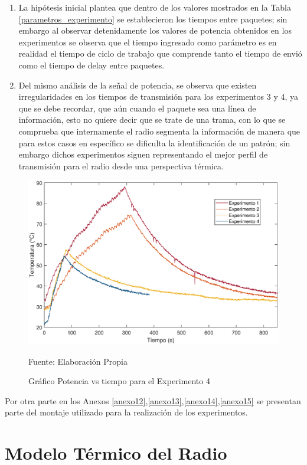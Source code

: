 \begin{enumerate}
     \item La hipótesis inicial plantea que dentro de los valores mostrados en la Tabla \ref{parametros_experimento} se establecieron los tiempos entre paquetes; sin embargo al observar detenidamente los valores de potencia obtenidos en los experimentos se observa que el tiempo ingresado como parámetro es en realidad el tiempo de ciclo de trabajo que comprende tanto el tiempo de envió como el tiempo de delay entre paquetes.
    \item Del mismo análisis de la señal de potencia, se observa que existen irregularidades en los tiempos de transmisión para los experimentos 3 y 4, ya que se debe recordar, que aún cuando el paquete sea una línea de información, esto no quiere decir que se trate de una trama, con lo que se comprueba que internamente el radio segmenta la información de manera que para estos casos en específico se dificulta la identificación de un patrón; sin embargo dichos experimentos siguen representando el mejor perfil de transmisión para el radio desde una perspectiva térmica.
 
\end{enumerate}

\begin{figure}[H]
\centering
\includegraphics[width=\linewidth]{Figuras/comparacion.eps}
\caption{Gráfico Potencia vs tiempo para el Experimento 4}
Fuente: Elaboración Propia
\label{comparacion}
\end{figure}

Por otra parte en los Anexos \ref{anexo12},\ref{anexo13},\ref{anexo14},\ref{anexo15} se presentan parte del montaje utilizado para la realización de los experimentos.

\newpage
\section{Modelo Térmico del Radio}

